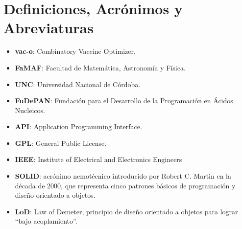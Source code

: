 \section{Definiciones, Acr\'onimos y Abreviaturas}
  \label{appendix-def}
  \begin{itemize}
    \item \textbf{vac-o}: Combinatory Vaccine Optimizer.
    \item \textbf{FaMAF}: Facultad de Matem\'atica, Astronom\'ia y F\'isica.
    \item \textbf{UNC}: Universidad Nacional de C\'ordoba.
    \item \textbf{FuDePAN}: Fundaci\'on para el Desarrollo de la Programaci\'on en \'Acidos Nucleicos.
    \item \textbf{API}: Application Programming Interface.
    \item \textbf{GPL}: General Public License.
    \item \textbf{IEEE}: Institute of Electrical and Electronics Engineers
    \item \textbf{SOLID}: acr\'onimo nemot\'ecnico introducido por Robert C. Martin en la d\'ecada de 2000, que representa cinco patrones b\'asicos de programaci\'on y dise\~no orientado a objetos.
    \item \textbf{LoD}: Law of Demeter, principio de dise\~no orientado a objetos para lograr ``bajo acoplamiento''.
    \end{itemize}